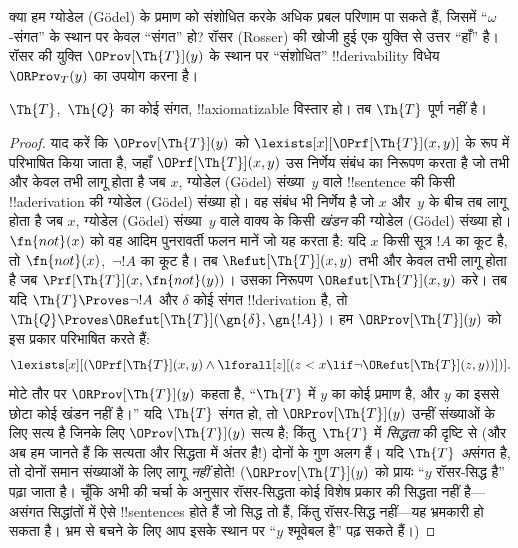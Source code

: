 \documentclass[../../../include/open-logic-section]{subfiles}
\begin{document}


क्या हम ग्योडेल (G\"odel) के प्रमाण को संशोधित करके अधिक प्रबल परिणाम पा
सकते हैं, जिसमें ``$\omega$-संगत'' के स्थान पर केवल ``संगत'' हो? रॉसर
(Rosser) की खोजी हुई एक युक्ति से उत्तर ``हाँ'' है। रॉसर की युक्ति
$\OProv[\Th{T}](y)$ के स्थान पर ``संशोधित'' !!{derivability} विधेय
$\ORProv_T(y)$ का उपयोग करना है।

\begin{thm}
$\Th{T}$,~$\Th{Q}$ का कोई संगत, !!{axiomatizable} विस्तार हो। तब
$\Th{T}$ पूर्ण नहीं है।
\end{thm}

\begin{proof}
याद करें कि $\OProv[\Th{T}](y)$ को
$\lexists[x][\OPrf[\Th{T}](x, y)]$ के रूप में परिभाषित किया जाता है, जहाँ
$\OPrf[\Th{T}](x, y)$ उस निर्णेय संबंध का निरूपण करता है जो तभी और केवल
तभी लागू होता है जब $x$, ग्योडेल (G\"odel) संख्या~$y$ वाले !!{sentence} की किसी
!!a{derivation} की ग्योडेल (G\"odel) संख्या हो। वह संबंध भी निर्णेय है जो $x$ और~$y$
के बीच तब लागू होता है जब $x$, ग्योडेल (G\"odel) संख्या~$y$ वाले वाक्य के किसी
\emph{खंडन} की ग्योडेल (G\"odel) संख्या हो। $\fn{not}(x)$ को वह आदिम पुनरावर्ती फलन
मानें जो यह करता है: यदि $x$ किसी सूत्र $!A$ का कूट है, तो
$\fn{not}(x)$,~$\lnot !A$ का कूट है। तब $\Refut[\Th{T}](x, y)$ तभी और केवल
तभी लागू होता है जब $\Prf[\Th{T}](x, \fn{not}(y))$। उसका निरूपण
$\ORefut[\Th{T}](x, y)$ करे। तब यदि $\Th{T} \Proves \lnot !A$ और
$\delta$ कोई संगत !!{derivation} है, तो
$\Th{Q} \Proves \ORefut[\Th{T}](\gn{\delta}, \gn{!A})$। हम
$\ORProv[\Th{T}](y)$ को इस प्रकार परिभाषित करते हैं:
\[
\lexists[x][(\OPrf[\Th{T}](x,y) \land \lforall[z][(z < x \lif \lnot
  \ORefut[\Th{T}](z,y))])].
\]
मोटे तौर पर $\ORProv[\Th{T}](y)$ कहता है, ``$\Th{T}$ में $y$ का कोई
प्रमाण है, और $y$ का इससे छोटा कोई खंडन नहीं है।'' यदि $\Th{T}$ संगत हो,
तो $\ORProv[\Th{T}](y)$ उन्हीं संख्याओं के लिए सत्य है जिनके लिए
$\OProv[\Th{T}](y)$ सत्य है; किंतु~$\Th{T}$ में \emph{सिद्धता} की दृष्टि
से (और अब हम जानते हैं कि सत्यता और सिद्धता में अंतर है!) दोनों के गुण
अलग हैं। यदि $\Th{T}$ \emph{अ}संगत है, तो दोनों समान संख्याओं के लिए लागू
\emph{नहीं} होते!{} ($\ORProv[\Th{T}](y)$ को प्रायः ``$y$ रॉसर-सिद्ध है''
पढ़ा जाता है। चूँकि अभी की चर्चा के अनुसार रॉसर-सिद्धता कोई विशेष प्रकार की
सिद्धता नहीं है---असंगत सिद्धांतों में ऐसे !!{sentence}s होते हैं जो सिद्ध
तो हैं, किंतु रॉसर-सिद्ध नहीं---यह भ्रमकारी हो सकता है। भ्रम से बचने के
लिए आप इसके स्थान पर ``$y$ श्मूवेबल है'' पढ़ सकते हैं।)


\end{proof}
\end{document}
